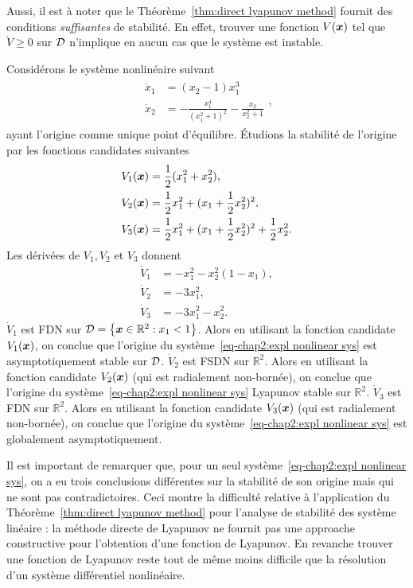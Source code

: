Aussi, il est à noter que le Théorème~\ref{thm:direct lyapunov method} fournit des conditions \emph{suffisantes} de stabilité. En effet, trouver une fonction $V(\bm{x})$ tel que $\dot{V}\geq0$ sur ${\cal D}$ n'implique en aucun cas que le système est instable. 
\begin{example}
	Considérons le système nonlinéaire suivant 
	\begin{align}\label{eq-chap2:expl nonlinear sys}
		\begin{split}
			\dot{x}_1 &=(x_2-1)x_1^3\\
			\dot{x}_2 &=-\frac{x_1^4}{(x_1^2+1)^2}-\frac{x_2}{x_2^2+1}
		\end{split},
	\end{align}
	ayant l'origine comme unique point d'équilibre. Étudions la stabilité de l'origine par les fonctions candidates suivantes 
	\begin{align}		
			\label{eq-chap2:V1}	V_1(\bm{x})&= \frac{1}{2}(x_1^2 + x_2^2),\\
			\label{eq-chap2:V2}	V_2(\bm{x})&= \frac{1}{2} x_1^2 + (x_1+\frac{1}{2} x_2^2)^2,\\
		\label{eq-chap2:V3}		V_3(\bm{x})&= \frac{1}{2} x_1^2 + (x_1+\frac{1}{2} x_2^2)^2 + \frac{1}{2} x_2^2	.	
	\end{align}
	Les dérivées de $V_1,V_2$ et $V_3$ donnent
	\begin{align}\label{eq-chap2:Vdot1}		
		\dot{V}_1&= -x_1^2 - x_2^2(1-x_1),\\
		\label{eq-chap2:Vdot2}	\dot{V}_2&= -3x_1^2,\\
	\label{eq-chap2:Vdot3}		\dot{V}_3&= -3x_1^2 -x_2^2	.	
	\end{align}
	$\dot{V}_1$ est FDN sur ${\cal D} = \left\{\bm{x}\in \mathbb{R}^2: x_1<1\right\}$. Alors en utilisant la fonction candidate $V_1(\bm{x})$, on conclue que l'origine du système~\eqref{eq-chap2:expl nonlinear sys} est asymptotiquement stable sur ${\cal D}$. 
	$\dot{V}_2$ est FSDN sur $\mathbb{R}^2$. Alors en utilisant la fonction candidate $V_2(\bm{x})$ (qui est radialement non-bornée), on conclue que l'origine du système~\eqref{eq-chap2:expl nonlinear sys} Lyapunov stable sur $\mathbb{R}^2$. 
	$\dot{V}_3$ est FDN sur $\mathbb{R}^2$. Alors en utilisant la fonction candidate $V_3(\bm{x})$ (qui est radialement non-bornée), on conclue que l'origine du système~\eqref{eq-chap2:expl nonlinear sys} est globalement asymptotiquement. 
\end{example}
Il est important de remarquer que, pour un seul système~\eqref{eq-chap2:expl nonlinear sys}, on a eu trois conclusions différentes  sur la stabilité de son origine mais qui ne sont pas contradictoires. Ceci montre la difficulté relative à l'application du Théorème~\ref{thm:direct lyapunov method} pour l'analyse de stabilité des système linéaire : la méthode directe de Lyapunov ne fournit pas une approache constructive pour l'obtention d'une fonction de Lyapunov. En revanche trouver une fonction de Lyapunov reste tout de même moins difficile que la résolution d'un système différentiel nonlinéaire.
